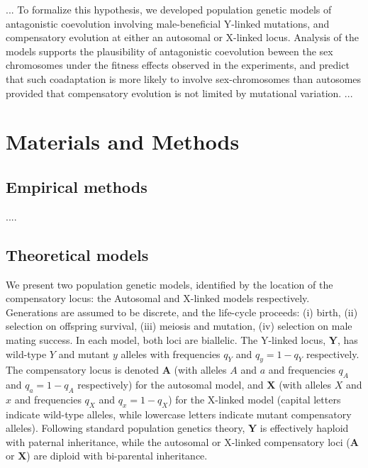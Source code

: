 \documentclass{article}
\begin{document}
... To formalize this hypothesis, we developed population genetic models of antagonistic coevolution involving male-beneficial Y-linked mutations, and compensatory evolution at either an autosomal or X-linked locus. Analysis of the models supports the plausibility of antagonistic coevolution beween the sex chromosomes under the fitness effects observed in the experiments, and predict that such coadaptation is more likely to involve sex-chromosomes than autosomes provided that compensatory evolution is not limited by mutational variation.  ...



\section{Materials and Methods} \label{sec:Methods}
\subsection{Empirical methods}

....

\subsection{Theoretical models}

We present two population genetic models, identified by the location of the compensatory locus: the Autosomal and X-linked models respectively. Generations are assumed to be discrete, and the life-cycle proceeds: (i) birth, (ii) selection on offspring survival, (iii) meiosis and mutation, (iv) selection on male mating success. In each model, both loci are biallelic. The Y-linked locus, $\mathbf{Y}$, has wild-type $Y$  and mutant $y$ alleles with frequencies $q_Y$ and $q_y = 1 - q_Y$ respectively. The compensatory locus is denoted $\mathbf{A}$ (with alleles $A$ and $a$ and frequencies $q_A$ and $q_a = 1 - q_A$ respectively) for the autosomal model, and $\mathbf{X}$ (with alleles $X$ and $x$ and frequencies $q_X$ and $q_x = 1 - q_X$) for the X-linked model (capital letters indicate wild-type alleles, while lowercase letters indicate mutant compensatory alleles). Following standard population genetics theory, $\mathbf{Y}$ is effectively haploid with paternal inheritance, while the autosomal or X-linked compensatory loci ($\mathbf{A}$ or $\mathbf{X}$) are diploid with bi-parental inheritance.
\end{document}
